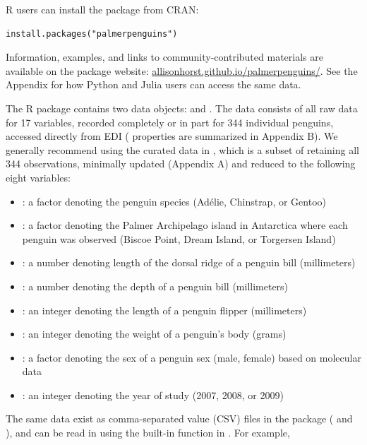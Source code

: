 R users can install the  package from CRAN:

\begin{verbatim}
install.packages("palmerpenguins")
\end{verbatim}

Information, examples, and links to community-contributed materials are
available on the  package website:
\href{https://allisonhorst.github.io/palmerpenguins/}{allisonhorst.github.io/palmerpenguins/}.
See the Appendix for how Python and Julia users can access the same
data.

The  R package contains two data objects:
 and . The  data
consists of all raw data for 17 variables, recorded completely or in
part for 344 individual penguins, accessed directly from EDI
( properties are summarized in Appendix B). We
generally recommend using the curated data in , which is
a subset of  retaining all 344 observations, minimally
updated (Appendix A) and reduced to the following eight variables:

\begin{itemize}
\tightlist
\item
  : a factor denoting the penguin species (Adélie,
  Chinstrap, or Gentoo)
\item
  : a factor denoting the Palmer Archipelago island in
  Antarctica where each penguin was observed (Biscoe Point, Dream
  Island, or Torgersen Island)
\item
  : a number denoting length of the dorsal ridge of
  a penguin bill (millimeters)
\item
  : a number denoting the depth of a penguin bill
  (millimeters)
\item
  : an integer denoting the length of a penguin
  flipper (millimeters)
\item
  : an integer denoting the weight of a penguin's body
  (grams)
\item
  : a factor denoting the sex of a penguin sex (male, female)
  based on molecular data
\item
  : an integer denoting the year of study (2007, 2008, or
  2009)
\end{itemize}

The same data exist as comma-separated value (CSV) files in the package
( and ), and can be read in
using the built-in  function in
. For example,

